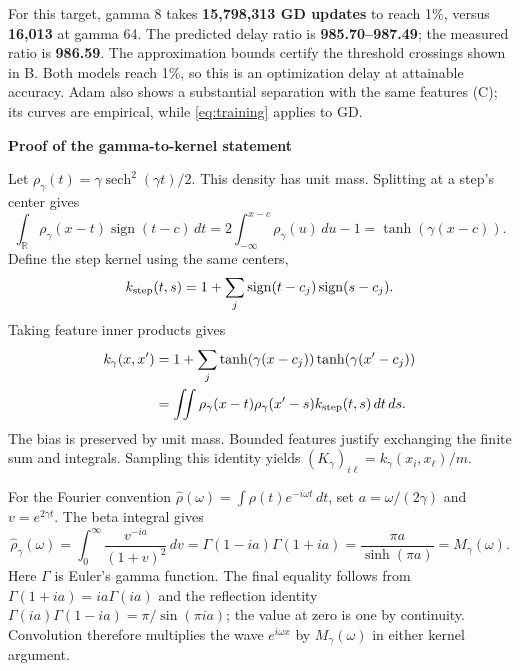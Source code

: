 \documentclass[10pt]{article}
\DeclareMathOperator{\sech}{sech}
\DeclareMathOperator{\sign}{sign}
\begin{document}
For this target, gamma 8 takes \textbf{15,798,313 GD updates} to reach 1\%, versus
\textbf{16,013} at gamma 64. The predicted delay ratio is \textbf{985.70--987.49};
the measured ratio is \textbf{986.59}. The approximation bounds certify the
threshold crossings shown in B. Both models reach 1\%, so this is an optimization
delay at attainable accuracy. Adam also shows a substantial separation with the
same features (C); its curves are empirical, while \eqref{eq:training} applies to GD.

\clearpage
{\color{ink}\large\bfseries Proof of the gamma-to-kernel statement}\par
Let $\rho_\gamma(t)=\gamma\sech^2(\gamma t)/2$. This density has unit mass.
Splitting at a step's center gives
\begin{equation*}
 \int_{\mathbb R}\rho_\gamma(x-t)\sign(t-c)\,dt
 =2\int_{-\infty}^{x-c}\rho_\gamma(u)\,du-1
 =\tanh(\gamma(x-c)).
\end{equation*}
Define the step kernel using the same centers,
\begin{equation*}
 k_{\rm step}(t,s)=1+\sum_j\sign(t-c_j)\sign(s-c_j).
\end{equation*}
Taking feature inner products gives
\begin{equation*}
\begin{split}
 k_\gamma(x,x')&=1+\sum_j\tanh(\gamma(x-c_j))\tanh(\gamma(x'-c_j))\\
 &=\iint\rho_\gamma(x-t)\rho_\gamma(x'-s)k_{\rm step}(t,s)\,dt\,ds.
\end{split}
\end{equation*}
The bias is preserved by unit mass. Bounded features justify exchanging the
finite sum and integrals. Sampling this identity yields
$(K_\gamma)_{i\ell}=k_\gamma(x_i,x_\ell)/m$.

For the Fourier convention $\widehat\rho(\omega)=\int\rho(t)e^{-i\omega t}\,dt$,
set $a=\omega/(2\gamma)$ and $v=e^{2\gamma t}$. The beta integral gives
\begin{equation*}
 \widehat\rho_\gamma(\omega)=\int_0^\infty\frac{v^{-ia}}{(1+v)^2}\,dv
 =\Gamma(1-ia)\Gamma(1+ia)=\frac{\pi a}{\sinh(\pi a)}=M_\gamma(\omega).
\end{equation*}
Here $\Gamma$ is Euler's gamma function. The final equality follows from
$\Gamma(1+ia)=ia\Gamma(ia)$ and the reflection identity
$\Gamma(ia)\Gamma(1-ia)=\pi/\sin(\pi ia)$; the value at zero is one by continuity.
Convolution therefore multiplies the wave $e^{i\omega x}$ by $M_\gamma(\omega)$
in either kernel argument.
\end{document}
